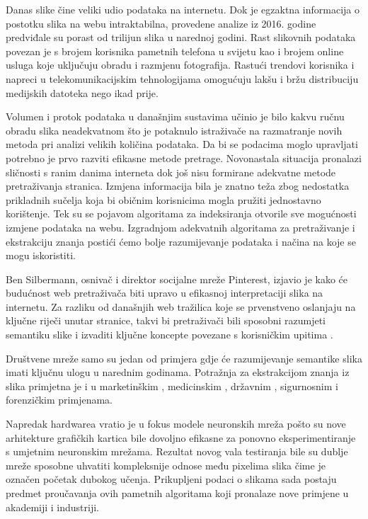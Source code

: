 \documentclass[times, utf8, proizvoljni, numeric]{fer}
\begin{document}
Danas slike čine veliki udio podataka na internetu. Dok je egzaktna informacija o postotku slika na webu intraktabilna, provedene analize iz 2016. godine \cite{img-analysis} predviđale su porast od trilijun slika u narednoj godini. Rast slikovnih podataka povezan je s brojem korisnika pametnih telefona u svijetu kao i brojem online usluga koje uključuju obradu i razmjenu fotografija. Rastući trendovi korisnika \cite{net-users} i napreci u telekomunikacijskim tehnologijama omogućuju lakšu i bržu distribuciju medijskih datoteka nego ikad prije. 

Volumen i protok podataka u današnjim sustavima učinio je bilo kakvu ručnu obradu slika neadekvatnom što je potaknulo istraživače na razmatranje novih metoda pri analizi velikih količina podataka. Da bi se podacima moglo upravljati potrebno je prvo razviti efikasne metode pretrage. Novonastala situacija pronalazi sličnosti s ranim danima interneta dok još nisu formirane adekvatne metode pretraživanja stranica. Izmjena informacija bila je znatno teža zbog nedostatka prikladnih sučelja koja bi običnim korisnicima mogla pružiti jednostavno korištenje. Tek su se pojavom algoritama za indeksiranja otvorile sve mogućnosti izmjene podataka na webu. Izgradnjom adekvatnih algoritama za pretraživanje i ekstrakciju znanja postići ćemo bolje razumijevanje podataka i načina na koje se mogu iskoristiti. 

Ben Silbermann, osnivač i direktor socijalne mreže Pinterest, izjavio je kako će budućnost web pretraživača biti upravo u efikasnoj interpretaciji slika na internetu. Za razliku od današnjih web tražilica koje se prvenstveno oslanjaju na ključne riječi unutar stranice, takvi bi pretraživači bili sposobni razumjeti semantiku slike i izvaditi ključne koncepte povezane s korisničkim upitima \cite{internet-trends}.

Društvene mreže samo su jedan od primjera gdje će razumijevanje semantike slika imati ključnu ulogu u narednim godinama. Potražnja za ekstrakcijom znanja iz slika primjetna je i u marketinškim \cite{electronic-commerce-application}, medicinskim \cite{medical-application} \cite{medical-diagnostics-application}, državnim \cite{smart-city-application}, sigurnosnim \cite{security-application} i forenzičkim \cite{forensics-application} primjenama. 

Napredak hardwarea vratio je u fokus modele neuronskih mreža pošto su nove arhitekture grafičkih kartica bile dovoljno efikasne za ponovno eksperimentiranje s umjetnim neuronskim mrežama. Rezultat novog vala testiranja bile su dublje mreže sposobne uhvatiti kompleksnije odnose među pixelima slika čime je označen početak dubokog učenja. Prikupljeni podaci o slikama sada postaju predmet proučavanja ovih pametnih algoritama koji pronalaze nove primjene u akademiji i industriji. 
\end{document}
